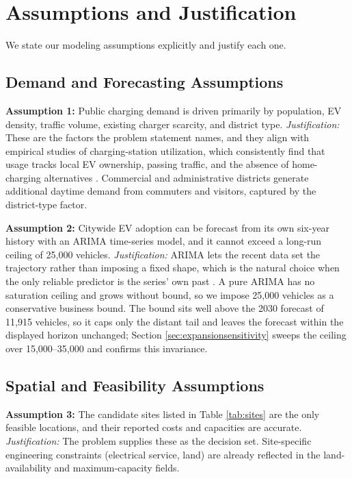 \documentclass[12pt]{article}
\begin{document}
\section{Assumptions and Justification}

We state our modeling assumptions explicitly and justify each one.

\subsection{Demand and Forecasting Assumptions}

\textbf{Assumption 1:} Public charging demand is driven primarily by population, EV
density, traffic volume, existing charger scarcity, and district type.
\textit{Justification:} These are the factors the problem statement names, and they align
with empirical studies of charging-station utilization, which consistently find that
usage tracks local EV ownership, passing traffic, and the absence of home-charging
alternatives \cite{DOE-AFDC, NREL2017}. Commercial and administrative districts generate
additional daytime demand from commuters and visitors, captured by the district-type
factor.

\textbf{Assumption 2:} Citywide EV adoption can be forecast from its own six-year history
with an ARIMA time-series model, and it cannot exceed a long-run ceiling of 25,000
vehicles.
\textit{Justification:} ARIMA lets the recent data set the trajectory rather than imposing
a fixed shape, which is the natural choice when the only reliable predictor is the series'
own past \cite{Box2015, Hyndman2018}. A pure ARIMA has no saturation ceiling and grows
without bound, so we impose 25,000 vehicles as a conservative business bound. The bound sits
well above the 2030 forecast of 11,915 vehicles, so it caps only the distant tail and leaves
the forecast within the displayed horizon unchanged; Section \ref{sec:expansionsensitivity} sweeps the ceiling over
15,000--35,000 and confirms this invariance.

\subsection{Spatial and Feasibility Assumptions}

\textbf{Assumption 3:} The candidate sites listed in Table \ref{tab:sites} are the only
feasible locations, and their reported costs and capacities are accurate.
\textit{Justification:} The problem supplies these as the decision set. Site-specific
engineering constraints (electrical service, land) are already reflected in the
land-availability and maximum-capacity fields.
\end{document}
